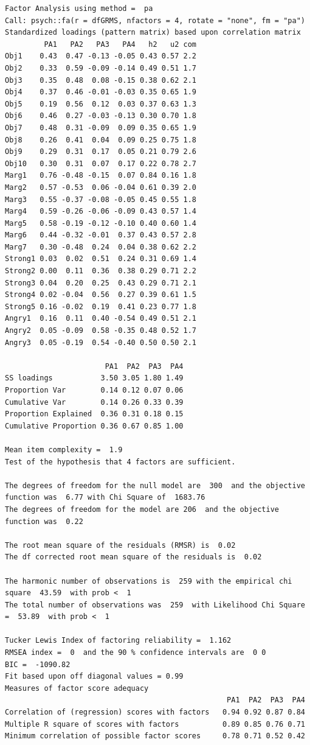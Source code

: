 \documentclass[
  english,
]{book}
\begin{document}
\begin{verbatim}
Factor Analysis using method =  pa
Call: psych::fa(r = dfGRMS, nfactors = 4, rotate = "none", fm = "pa")
Standardized loadings (pattern matrix) based upon correlation matrix
         PA1   PA2   PA3   PA4   h2   u2 com
Obj1    0.43  0.47 -0.13 -0.05 0.43 0.57 2.2
Obj2    0.33  0.59 -0.09 -0.14 0.49 0.51 1.7
Obj3    0.35  0.48  0.08 -0.15 0.38 0.62 2.1
Obj4    0.37  0.46 -0.01 -0.03 0.35 0.65 1.9
Obj5    0.19  0.56  0.12  0.03 0.37 0.63 1.3
Obj6    0.46  0.27 -0.03 -0.13 0.30 0.70 1.8
Obj7    0.48  0.31 -0.09  0.09 0.35 0.65 1.9
Obj8    0.26  0.41  0.04  0.09 0.25 0.75 1.8
Obj9    0.29  0.31  0.17  0.05 0.21 0.79 2.6
Obj10   0.30  0.31  0.07  0.17 0.22 0.78 2.7
Marg1   0.76 -0.48 -0.15  0.07 0.84 0.16 1.8
Marg2   0.57 -0.53  0.06 -0.04 0.61 0.39 2.0
Marg3   0.55 -0.37 -0.08 -0.05 0.45 0.55 1.8
Marg4   0.59 -0.26 -0.06 -0.09 0.43 0.57 1.4
Marg5   0.58 -0.19 -0.12 -0.10 0.40 0.60 1.4
Marg6   0.44 -0.32 -0.01  0.37 0.43 0.57 2.8
Marg7   0.30 -0.48  0.24  0.04 0.38 0.62 2.2
Strong1 0.03  0.02  0.51  0.24 0.31 0.69 1.4
Strong2 0.00  0.11  0.36  0.38 0.29 0.71 2.2
Strong3 0.04  0.20  0.25  0.43 0.29 0.71 2.1
Strong4 0.02 -0.04  0.56  0.27 0.39 0.61 1.5
Strong5 0.16 -0.02  0.19  0.41 0.23 0.77 1.8
Angry1  0.16  0.11  0.40 -0.54 0.49 0.51 2.1
Angry2  0.05 -0.09  0.58 -0.35 0.48 0.52 1.7
Angry3  0.05 -0.19  0.54 -0.40 0.50 0.50 2.1

                       PA1  PA2  PA3  PA4
SS loadings           3.50 3.05 1.80 1.49
Proportion Var        0.14 0.12 0.07 0.06
Cumulative Var        0.14 0.26 0.33 0.39
Proportion Explained  0.36 0.31 0.18 0.15
Cumulative Proportion 0.36 0.67 0.85 1.00

Mean item complexity =  1.9
Test of the hypothesis that 4 factors are sufficient.

The degrees of freedom for the null model are  300  and the objective function was  6.77 with Chi Square of  1683.76
The degrees of freedom for the model are 206  and the objective function was  0.22 

The root mean square of the residuals (RMSR) is  0.02 
The df corrected root mean square of the residuals is  0.02 

The harmonic number of observations is  259 with the empirical chi square  43.59  with prob <  1 
The total number of observations was  259  with Likelihood Chi Square =  53.89  with prob <  1 

Tucker Lewis Index of factoring reliability =  1.162
RMSEA index =  0  and the 90 % confidence intervals are  0 0
BIC =  -1090.82
Fit based upon off diagonal values = 0.99
Measures of factor score adequacy             
                                                   PA1  PA2  PA3  PA4
Correlation of (regression) scores with factors   0.94 0.92 0.87 0.84
Multiple R square of scores with factors          0.89 0.85 0.76 0.71
Minimum correlation of possible factor scores     0.78 0.71 0.52 0.42
\end{verbatim}
\end{document}
